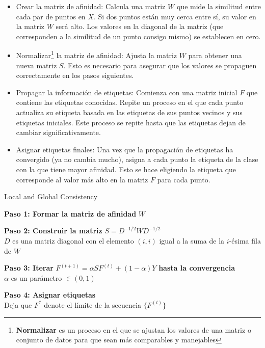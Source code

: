 \begin{itemize}
	\item Crear la matriz de afinidad: Calcula una matriz $W$ que mide la similitud entre cada par de puntos en $X$. Si dos puntos están muy cerca entre sí, su valor en la matriz $W$ será alto. Los valores en la diagonal de la matriz (que corresponden a la similitud de un punto consigo mismo) se establecen en cero.
	\item Normalizar\footnote{\textbf{Normalizar} es un proceso en el que se ajustan los valores de una matriz o conjunto de datos para que sean más comparables y manejables} la matriz de afinidad: Ajusta la matriz	$W$ para obtener una nueva matriz $S$. Esto es necesario para asegurar que los valores se propaguen correctamente en los pasos siguientes.
	\item Propagar la información de etiquetas: Comienza con una matriz inicial $F$ que contiene las etiquetas conocidas. Repite un proceso en el que cada punto actualiza su etiqueta basada en las etiquetas de sus puntos vecinos y sus etiquetas iniciales. Este proceso se repite hasta que las etiquetas dejan de cambiar significativamente.
	\item Asignar etiquetas finales: Una vez que la propagación de etiquetas ha convergido (ya no cambia mucho), asigna a cada punto la etiqueta de la clase con la que tiene mayor afinidad. Esto se hace eligiendo la etiqueta que corresponde al valor más alto en la matriz $F$ para cada punto.
\end{itemize}
\begin{algorithm}
	\caption{Local and Global Consistency}
	\label{alg:LGC}
	
	\BlankLine
	\textbf{Paso 1: Formar la matriz de afinidad} $W$ \\
	
	\BlankLine
	\textbf{Paso 2: Construir la matriz} $S = D^{-1/2} W D^{-1/2}$ \\
	$D$ es una matriz diagonal con el elemento $(i, i)$ igual a la suma de la $i$-ésima fila de $W$
	
	\BlankLine
	\textbf{Paso 3: Iterar} $F^{(t+1)} = \alpha S F^{(t)} + (1 - \alpha) Y$ \textbf{hasta la convergencia} \\
	$\alpha$ es un parámetro $\in (0, 1)$
	
	\BlankLine
	\textbf{Paso 4: Asignar etiquetas} \\
	Deja que $F^*$ denote el límite de la secuencia $\{F^{(t)}\}$ \\
	
	
\end{algorithm}

